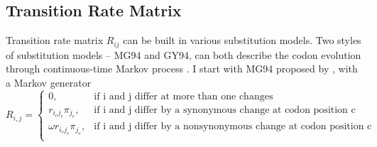 \subsection{Transition Rate Matrix}
Transition rate matrix $R_{ij}$ can be built in various substitution models. Two styles of substitution models -- MG94 and GY94, can both describe the codon evolution through continuous-time Markov process \parencite{rodrigue2008bayesian}. I start with MG94 proposed by \cite{muse1994likelihood}, with a Markov generator
\[
R_{i,j} = \begin{cases}
                    0, & \text{if i and j differ at more than one changes}\\
                    r_{{i_c} {j_c}} \pi_{j_c}, & \text{if i and j differ by a synonymous change at codon position c}\\
                    \omega r_{{i_c} {j_c}} \pi_{j_c}, & \text{if i and j differ by a nonsynonymous change at codon position c}\\
          \end{cases}
\]

